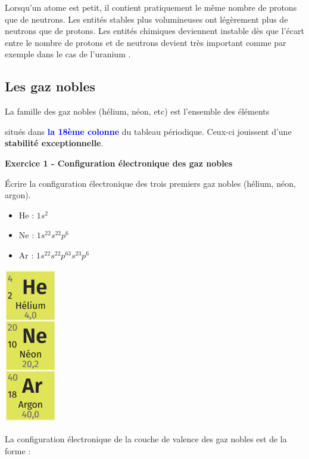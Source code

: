 \documentclass[french, a4paper, 12pt]{article}
\newcommand{\exo}[3]{
	\begin{mdframed}[style=exo, leftmargin=0pt, rightmargin=0pt, innertopmargin=8pt, innerbottommargin=8pt, innerrightmargin=10pt, innerleftmargin=10pt]

		\noindent \textbf{Exercice #1 - #2}\medskip

		#3
	\end{mdframed}
}
\begin{document}
Lorsqu'un atome est petit, il contient pratiquement le même nombre de protons que de neutrons. Les entités stables plus volumineuses ont légèrement plus de neutrons que de protons. Les entités chimiques deviennent instable dès que l'écart entre le nombre de protons et de neutrons devient très important comme par exemple dans le cas de l'uranium .


\subsection{Les gaz nobles}
\begin{minipage}{.8\textwidth}

La famille des gaz nobles (hélium, néon, etc) est l'ensemble des éléments\medskip

situés dans \textbf{\textcolor{blue}{la 18ème colonne}}  du tableau périodique. Ceux-ci jouissent d'une \textbf{stabilité exceptionnelle}.

\exo{1}{Configuration électronique des gaz nobles}{Écrire la configuration électronique des trois premiers gaz nobles (hélium, néon, argon).

\begin{itemize}
	\item He : $1s^2$
	\item Ne : $1s^22s^22p^6$
	\item Ar : $1s^22s^22p^63s^23p^6$
\end{itemize}
}
\end{minipage}\hspace{1cm}
\begin{minipage}{.2\textwidth}
	\includegraphics[scale=.8]{GazNobles.png}
\end{minipage}\bigskip

La configuration électronique de la couche de valence des gaz nobles est de la forme : 
\end{document}
